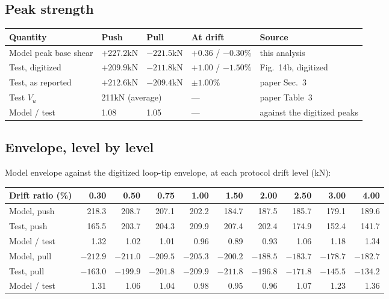 \documentclass[11pt,a4paper]{article}
\begin{document}
\subsection{Peak strength}

\begin{tabularx}{\textwidth}{@{}p{36mm}p{24mm}p{24mm}p{26mm}>{\raggedright\arraybackslash}X@{}}
\toprule
\textbf{Quantity} & \textbf{Push} & \textbf{Pull} & \textbf{At drift} & \textbf{Source} \\
\midrule
Model peak base shear & $+227.2$\unit{kN} & $-221.5$\unit{kN} & $+0.36$ / $-0.30\%$ & this analysis \\
Test, digitized       & $+209.9$\unit{kN} & $-211.8$\unit{kN} & $+1.00$ / $-1.50\%$ & Fig.~14b, digitized \\
Test, as reported     & $+212.6$\unit{kN} & $-209.4$\unit{kN} & $\pm1.00\%$ & paper Sec.~3 \\
Test $V_u$            & \multicolumn{2}{l}{211\unit{kN} (average)} & --- & paper Table~3 \\
Model / test          & 1.08 & 1.05 & --- & against the digitized peaks \\
\bottomrule
\end{tabularx}

\subsection{Envelope, level by level}

Model envelope against the digitized loop-tip envelope, at each protocol drift level (kN):

\begin{center}\small
\begin{tabular}{@{}lrrrrrrrrr@{}}
\toprule
Drift ratio (\%) & 0.30 & 0.50 & 0.75 & 1.00 & 1.50 & 2.00 & 2.50 & 3.00 & 4.00 \\
\midrule
Model, push      & 218.3 & 208.7 & 207.1 & 202.2 & 184.7 & 187.5 & 185.7 & 179.1 & 189.6 \\
Test, push       & 165.5 & 203.7 & 204.3 & 209.9 & 207.4 & 202.4 & 174.9 & 152.4 & 141.7 \\
Model / test     & 1.32 & 1.02 & 1.01 & 0.96 & 0.89 & 0.93 & 1.06 & 1.18 & 1.34 \\
\midrule
Model, pull      & $-212.9$ & $-211.0$ & $-209.5$ & $-205.3$ & $-200.2$ & $-188.5$ & $-183.7$ & $-178.7$ & $-182.7$ \\
Test, pull       & $-163.0$ & $-199.9$ & $-201.8$ & $-209.9$ & $-211.8$ & $-196.8$ & $-171.8$ & $-145.5$ & $-134.2$ \\
Model / test     & 1.31 & 1.06 & 1.04 & 0.98 & 0.95 & 0.96 & 1.07 & 1.23 & 1.36 \\
\bottomrule
\end{tabular}\end{center}
\end{document}
